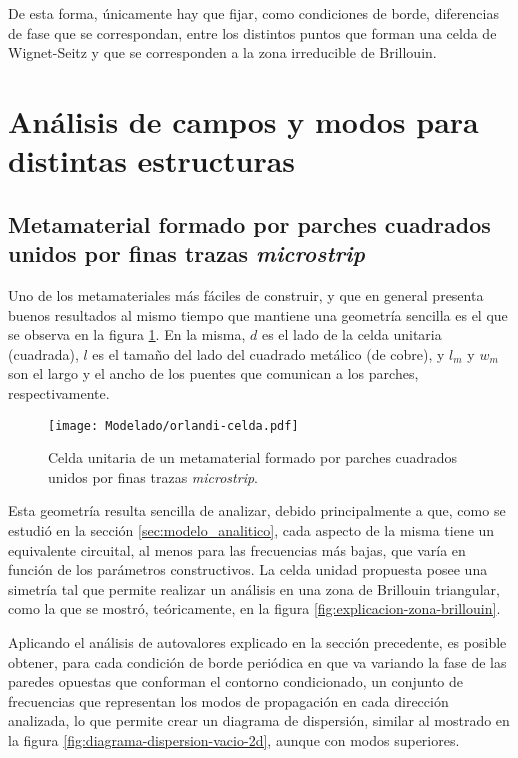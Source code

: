 De esta forma, únicamente hay que fijar, como condiciones de borde, diferencias de fase que se correspondan, entre los distintos puntos que forman una celda de Wignet-Seitz y que se corresponden a la zona irreducible de Brillouin.



\section{Análisis de campos y modos para distintas estructuras}
\label{sec_estructuras_propuestas}

\subsection{Metamaterial formado por parches cuadrados unidos por finas trazas \textit{microstrip}}
\label{sec:celda-orlandi}

Uno de los metamateriales más fáciles de construir, y que en general presenta buenos resultados al mismo tiempo que mantiene una geometría sencilla es el que se observa en la figura \ref{fig:celda-orlandi}. En la misma, $d$ es el lado de la celda unitaria (cuadrada), $l$ es el tamaño del lado del cuadrado metálico (de cobre), y $l_m$ y $w_m$ son el largo y el ancho de los puentes que comunican a los parches, respectivamente.

\begin{figure}[h]
	\centering
	\texttt{[image: Modelado/orlandi-celda.pdf]}
	\caption{Celda unitaria de un metamaterial formado por parches cuadrados unidos por finas trazas \textit{microstrip}.}
	\label{fig:celda-orlandi}
\end{figure}

Esta geometría resulta sencilla de analizar, debido principalmente a que, como se estudió en la sección \ref{sec:modelo_analitico}, cada aspecto de la misma tiene un equivalente circuital, al menos para las frecuencias más bajas, que varía en función de los parámetros constructivos. La celda unidad propuesta posee una simetría tal que permite realizar un análisis en una zona de Brillouin triangular, como la que se mostró, teóricamente, en la figura \ref{fig:explicacion-zona-brillouin}.

Aplicando el análisis de autovalores explicado en la sección precedente, es posible obtener, para cada condición de borde periódica en que va variando la fase de las paredes opuestas que conforman el contorno condicionado, un conjunto de frecuencias que representan los modos de propagación en cada dirección analizada, lo que permite crear un diagrama de dispersión, similar al mostrado en la figura \ref{fig:diagrama-dispersion-vacio-2d}, aunque con modos superiores.

